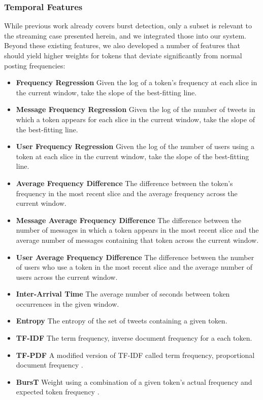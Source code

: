 \documentclass{acm_proc_article-sp}
\begin{document}
\subsubsection{Temporal Features}

While previous work already covers burst detection, only a subset is relevant to the streaming case presented herein, and we integrated those into our system.
Beyond these existing features, we also developed a number of features that should yield higher weights for tokens that deviate significantly from normal posting frequencies:

\begin{itemize}
\item \textbf{Frequency Regression} Given the log of a token's frequency at each slice in the current window, take the slope of the best-fitting line.
\item \textbf{Message Frequency Regression} Given the log of the number of tweets in which a token appears for each slice in the current window, take the slope of the best-fitting line.
\item \textbf{User Frequency Regression} Given the log of the number of users using a token at each slice in the current window, take the slope of the best-fitting line.
\item \textbf{Average Frequency Difference} The difference between the token's frequency in the most recent slice and the average frequency across the current window.
\item \textbf{Message Average Frequency Difference} The difference between the number of messages in which a token appears in the most recent slice and the average number of messages containing that token across the current window.
\item \textbf{User Average Frequency Difference} The difference between the number of users who use a token in the most recent slice and the average number of users across the current window.
\item \textbf{Inter-Arrival Time} The average number of seconds between token occurrences in the given window.
\item \textbf{Entropy} The entropy of the set of tweets containing a given token.
\item \textbf{TF-IDF} The term frequency, inverse document frequency for a each token.
\item \textbf{TF-PDF} A modified version of TF-IDF called term frequency, proportional document frequency \cite{Bun:2002:TEN:645962.674082}.
\item \textbf{BursT} Weight using a combination of a given token's actual frequency and expected token frequency \cite{Lee:2011:BDT:2009463.2009531}.
\end{itemize}
\end{document}
